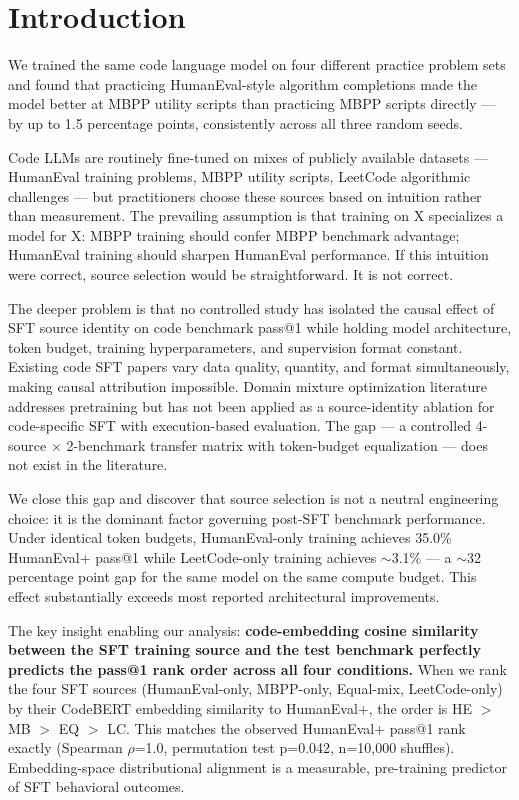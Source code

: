 \section{Introduction}

We trained the same code language model on four different practice problem sets and found that
practicing HumanEval-style algorithm completions made the model better at MBPP utility scripts
than practicing MBPP scripts directly --- by up to 1.5 percentage points, consistently across
all three random seeds.

Code LLMs are routinely fine-tuned on mixes of publicly available datasets --- HumanEval
training problems, MBPP utility scripts, LeetCode algorithmic challenges --- but practitioners
choose these sources based on intuition rather than measurement. The prevailing assumption is
that training on X specializes a model for X: MBPP training should confer MBPP benchmark
advantage; HumanEval training should sharpen HumanEval performance. If this intuition were
correct, source selection would be straightforward. It is not correct.

The deeper problem is that no controlled study has isolated the causal effect of SFT source
identity on code benchmark pass@1 while holding model architecture, token budget, training
hyperparameters, and supervision format constant. Existing code SFT papers vary data quality,
quantity, and format simultaneously, making causal attribution impossible. Domain mixture
optimization literature \cite{Xie2023DoReMi,Zhang2026DomainPilot} addresses pretraining but has not
been applied as a source-identity ablation for code-specific SFT with execution-based
evaluation. The gap --- a controlled 4-source $\times$ 2-benchmark transfer matrix with token-budget
equalization --- does not exist in the literature.

We close this gap and discover that source selection is not a neutral engineering choice: it
is the dominant factor governing post-SFT benchmark performance. Under identical token budgets,
HumanEval-only training achieves 35.0\% HumanEval+ pass@1 while LeetCode-only training achieves
$\sim$3.1\% --- a $\sim$32 percentage point gap for the same model on the same compute budget. This effect
substantially exceeds most reported architectural improvements.

The key insight enabling our analysis: \textbf{code-embedding cosine similarity between the SFT
training source and the test benchmark perfectly predicts the pass@1 rank order across all four
conditions.} When we rank the four SFT sources (HumanEval-only, MBPP-only, Equal-mix,
LeetCode-only) by their CodeBERT embedding similarity to HumanEval+, the order is
HE $>$ MB $>$ EQ $>$ LC. This matches the observed HumanEval+ pass@1 rank exactly (Spearman
$\rho$=1.0, permutation test p=0.042, n=10,000 shuffles). Embedding-space distributional alignment
is a measurable, pre-training predictor of SFT behavioral outcomes.

